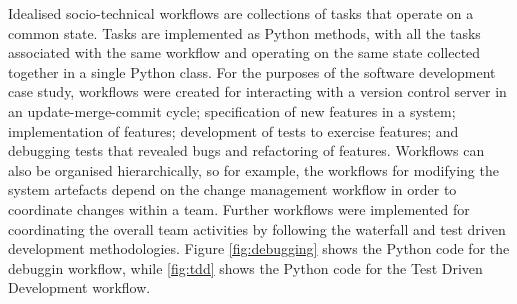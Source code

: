 \documentclass{sig-alternate}
\begin{document}
Idealised socio-technical workflows are collections of tasks that operate on a common state.  Tasks are implemented as
Python methods, with all the tasks associated with the same workflow and operating on the same state collected together
in a single Python class.  For the purposes of the software development case study, workflows were created for
interacting with a version control server in an update-merge-commit cycle; specification of new features in a system;
implementation of features; development of tests to exercise features; and debugging tests that revealed bugs and
refactoring of features.  Workflows can also be organised hierarchically, so for example, the workflows for modifying
the system artefacts depend on the change management workflow in order to coordinate changes within a team.  Further
workflows were implemented for coordinating the overall team activities by following the waterfall and test driven
development methodologies.  Figure \ref{fig:debugging} shows the Python code for the debuggin workflow, while
\ref{fig:tdd} shows the Python code for the Test Driven Development workflow.
\end{document}
